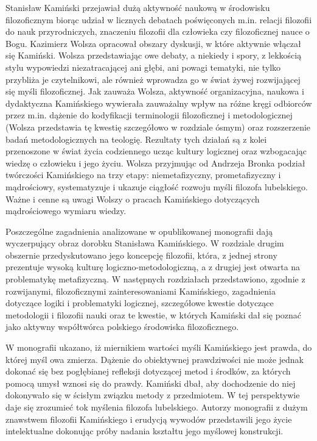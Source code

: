 \documentclass[a4paper]{article}
\begin{document}
Stanisław Kamiński przejawiał dużą aktywność naukową w środowisku filozoficznym biorąc udział w licznych debatach
poświęconych m.in. relacji filozofii do nauk przyrodniczych, znaczeniu filozofii dla człowieka czy filozoficznej nauce
o Bogu. Kazimierz Wolsza opracował obszary dyskusji, w które aktywnie włączał się Kamiński. Wolsza przedstawiając owe
debaty, a niekiedy i spory, z lekkością stylu wypowiedzi niezatracającej ani głębi, ani powagi tematyki, nie tylko
przybliża je czytelnikowi, ale również wprowadza go w świat żywej rozwijającej się myśli filozoficznej. Jak zauważa
Wolsza, aktywność organizacyjna, naukowa i dydaktyczna Kamińskiego wywierała zauważalny wpływ na różne kręgi odbiorców
przez m.in. dążenie do kodyfikacji terminologii filozoficznej i metodologicznej (Wolsza przedstawia tę kwestię
szczegółowo w rozdziale ósmym) oraz rozszerzenie badań metodologicznych na teologię. Rezultaty tych działań są z kolei
przenoszone w świat życia codziennego ucząc kultury logicznej oraz wzbogacając wiedzę o człowieku i jego życiu. Wolsza
przyjmując od Andrzeja Bronka podział twórczości Kamińskiego na trzy etapy: niemetafizyczny, prometafizyczny i
mądrościowy, systematyzuje i ukazuje ciągłość rozwoju myśli filozofa lubelskiego. Ważne i cenne są uwagi Wolszy o
pracach Kamińskiego dotyczących mądrościowego wymiaru wiedzy. 

Poszczególne zagadnienia analizowane w opublikowanej monografii dają wyczerpujący obraz dorobku Stanisława Kamińskiego.
W rozdziale drugim obszernie przedyskutowano jego koncepcję filozofii, która, z jednej strony prezentuje wysoką kulturę
logiczno-metodologiczną, a z drugiej jest otwarta na problematykę metafizyczną. W następnych rozdziałach przedstawiono,
zgodnie z rozwijanymi, filozoficznymi zainteresowaniami Kamińskiego, zagadnienia dotyczące logiki i problematyki
logicznej, szczegółowe kwestie dotyczące metodologii i filozofii nauki oraz te kwestie, w których Kamiński dał się
poznać jako aktywny współtwórca polskiego środowiska filozoficznego.

W monografii ukazano, iż miernikiem wartości myśli Kamińskiego jest prawda, do której myśl owa zmierza. Dążenie do
obiektywnej prawdziwości nie może jednak dokonać się bez pogłębianej refleksji dotyczącej metod i środków, za których
pomocą umysł wznosi się do prawdy. Kamiński dbał, aby dochodzenie do niej dokonywało się w ścisłym związku metody z
przedmiotem. W tej perspektywie daje się zrozumieć tok myślenia filozofa lubelskiego. Autorzy monografii z dużym
znawstwem filozofii Kamińskiego i erudycją wywodów przedstawili jego życie intelektualne dokonując próby nadania
kształtu jego myślowej konstrukcji.
\end{document}
